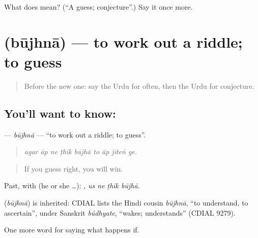 \begin{tcolorbox}[breakable,colback=teal!4,colframe=teal!35!black,title={Before you move on}]
What does  mean? (\textquotedblleft{}A guess; conjecture\textquotedblright{}.) Say it once more.
\end{tcolorbox}
\section[\texorpdfstring{\ur{بوجھنا} (būjhnā)}{بوجھنا (būjhnā)}]{ (būjhnā) — to work out a riddle; to guess}

\label{lesson:UR-C362-bujhna-guess}



\begin{quote}
Before the new one: say the Urdu for often, then the Urdu for conjecture.
\end{quote}

\subsection*{You'll want to know: }
\textbf{} — \emph{būjhnā} — \textquotedblleft{}to work out a riddle; to guess\textquotedblright{}.

\begin{quote}
        
\end{quote}

\begin{quote}
\emph{agar āp ne ṭhīk būjhā to āp jīteṅ ge.}
\end{quote}

\begin{quote}
If you guess right, you will win.
\end{quote}

Past, with  (he or she …):    , \emph{us ne ṭhīk būjhā}.

\begin{cousinweb}
\textbf{} (\emph{būjhnā}) is inherited: CDIAL lists the Hindi cousin \emph{būjhnā}, \textquotedblleft{}to understand, to ascertain\textquotedblright{}, under Sanskrit \emph{búdhyate}, \textquotedblleft{}wakes; understands\textquotedblright{} (CDIAL 9279).
\end{cousinweb}

\begin{grammarlens}[title={What you've built}]
One more word for saying what happens if.
\end{grammarlens}

